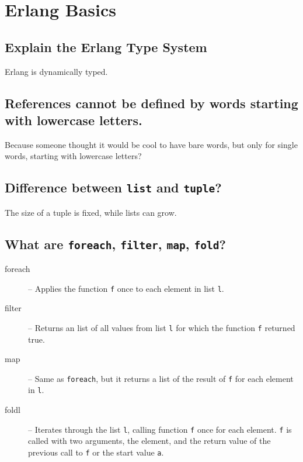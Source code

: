 \documentclass[12pt]{article}
\newcommand{\inline}{\lstinline[basicstyle=\ttfamily]}
\begin{document}
\section{Erlang Basics}
\subsection{Explain the Erlang Type System}

  Erlang is dynamically typed.

\subsection{References cannot be defined by words starting with lowercase
letters.}

  Because someone thought it would be cool to have bare words, but only
  for single words, starting with lowercase letters?

\subsection{Difference between \inline{list} and \inline{tuple}?}

  The size of a tuple is fixed, while lists can grow.

\subsection{What are \inline{foreach}, \inline{filter}, \inline{map}, \inline{fold}?}

\begin{description}
  \item[foreach] -- Applies the function \inline{f} once to each
  element in list \inline{l}.

\item[filter] -- Returns an list of all values from list \inline{l}
  for which the function \inline{f} returned true.

\item[map] -- Same as \inline{foreach}, but it returns a list
  of the result of \inline{f} for each element in \inline{l}.

\item[foldl] -- Iterates through the list \inline{l}, calling
  function \inline{f} once for each element. \inline{f} is called 
  with two arguments, the element, and the return value of the previous
  call to \inline{f} or the start value \inline{a}.
\end{description}
\end{document}
